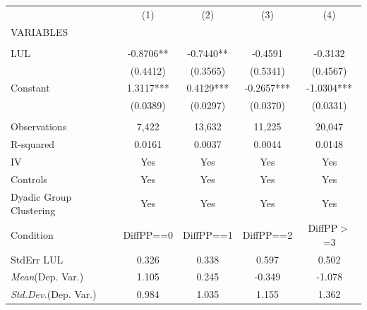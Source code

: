 \documentclass[]{article}
\begin{document}
\begin{tabular}{lcccc} \hline
 & (1) & (2) & (3) & (4) \\
VARIABLES &  &  &  &  \\ \hline
 &  &  &  &  \\
LUL & -0.8706** & -0.7440** & -0.4591 & -0.3132 \\
 & (0.4412) & (0.3565) & (0.5341) & (0.4567) \\
Constant & 1.3117*** & 0.4129*** & -0.2657*** & -1.0304*** \\
 & (0.0389) & (0.0297) & (0.0370) & (0.0331) \\
 &  &  &  &  \\
Observations & 7,422 & 13,632 & 11,225 & 20,047 \\
R-squared & 0.0161 & 0.0037 & 0.0044 & 0.0148 \\
IV & Yes & Yes & Yes & Yes \\
Controls & Yes & Yes & Yes & Yes \\
Dyadic Group Clustering & Yes & Yes & Yes & Yes \\
Condition & DiffPP==0 & DiffPP==1 & DiffPP==2 & DiffPP$>$=3 \\
StdErr LUL & 0.326 & 0.338 & 0.597 & 0.502 \\
\textit{Mean}(Dep. Var.) & 1.105 & 0.245 & -0.349 & -1.078 \\
 \textit{Std.Dev.}(Dep. Var.) & 0.984 & 1.035 & 1.155 & 1.362 \\ \hline
\end{tabular}
\end{document}
